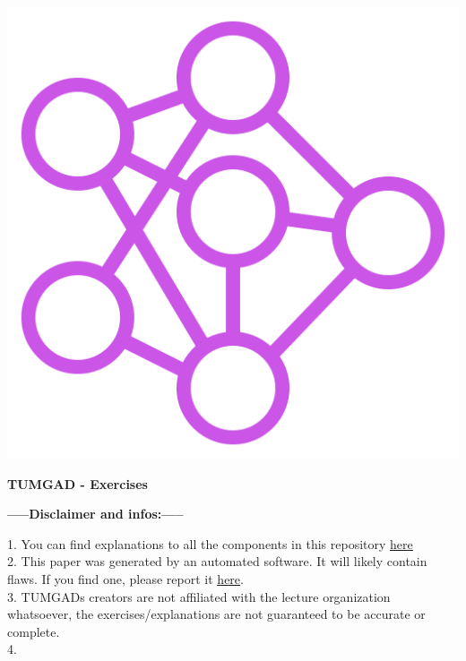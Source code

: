 \documentclass[12pt]{article}
\begin{document}

    \begin{center}
        \includegraphics[scale=0.25]{favicon.png} %
        \vspace{15px}

        {\selectfont
            \textbf{\LARGE{TUMGAD - Exercises}}\\
         
        }
    \end{center}
    \begin{center}
        \textbf{\LARGE{-----Disclaimer and infos:-----}}
        \\[0.2in]
    \end{center}
    \large{ %
        1. You can find explanations to all the components in this repository \href{https://sebastianoner.github.io/TUMGAD/src/routes}{\underline{here}}
        \\[0.2in]
        2. This paper was generated by an automated software. It will likely contain flaws. If you find one, please report it
        \href{https://github.com/SebastianOner/TUMGAD/issues/new?assignees=&labels=&template=bug_report.md&title=}{\underline{here}}.
        \\[0.2in]
        3. TUMGADs creators are not affiliated with the lecture organization whatsoever, the exercises/explanations are not
        guaranteed to be accurate or complete.
        \\[0.2in]
        4.
    }
\end{document}
